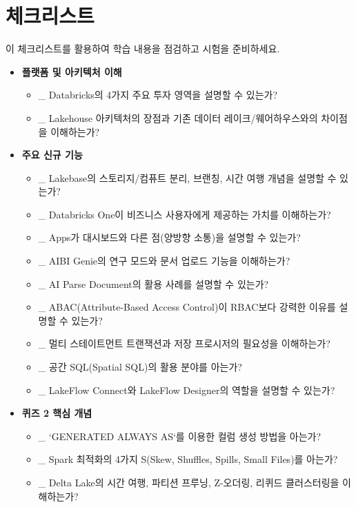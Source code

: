 \documentclass[11pt,a4paper]{article}
\begin{document}
\newpage
\section*{체크리스트}

이 체크리스트를 활용하여 학습 내용을 점검하고 시험을 준비하세요.

\begin{itemize}
    \item \textbf{플랫폼 및 아키텍처 이해}
    \begin{itemize}
        \item \_ Databricks의 4가지 주요 투자 영역을 설명할 수 있는가?
        \item \_ Lakehouse 아키텍처의 장점과 기존 데이터 레이크/웨어하우스와의 차이점을 이해하는가?
    \end{itemize}
    \item \textbf{주요 신규 기능}
    \begin{itemize}
        \item \_ Lakebase의 스토리지/컴퓨트 분리, 브랜칭, 시간 여행 개념을 설명할 수 있는가?
        \item \_ Databricks One이 비즈니스 사용자에게 제공하는 가치를 이해하는가?
        \item \_ Apps가 대시보드와 다른 점(양방향 소통)을 설명할 수 있는가?
        \item \_ AIBI Genie의 연구 모드와 문서 업로드 기능을 이해하는가?
        \item \_ AI Parse Document의 활용 사례를 설명할 수 있는가?
        \item \_ ABAC(Attribute-Based Access Control)이 RBAC보다 강력한 이유를 설명할 수 있는가?
        \item \_ 멀티 스테이트먼트 트랜잭션과 저장 프로시저의 필요성을 이해하는가?
        \item \_ 공간 SQL(Spatial SQL)의 활용 분야를 아는가?
        \item \_ LakeFlow Connect와 LakeFlow Designer의 역할을 설명할 수 있는가?
    \end{itemize}
    \item \textbf{퀴즈 2 핵심 개념}
    \begin{itemize}
        \item \_ `GENERATED ALWAYS AS`를 이용한 컬럼 생성 방법을 아는가?
        \item \_ Spark 최적화의 4가지 S(Skew, Shuffles, Spills, Small Files)를 아는가?
        \item \_ Delta Lake의 시간 여행, 파티션 프루닝, Z-오더링, 리퀴드 클러스터링을 이해하는가?

\end{itemize}
\end{itemize}
\end{document}
